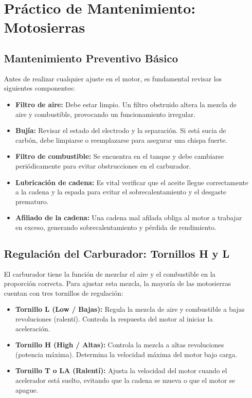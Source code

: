 \documentclass[../main]{subfiles}
\begin{document}
\section{Práctico de Mantenimiento: Motosierras}


\subsection{Mantenimiento Preventivo Básico}

Antes de realizar cualquier ajuste en el motor, es fundamental revisar los siguientes componentes:

\begin{itemize}
    \item \textbf{Filtro de aire:} Debe estar limpio. Un filtro obstruido altera la mezcla de aire y combustible, provocando un funcionamiento irregular.
    \item \textbf{Bujía:} Revisar el estado del electrodo y la separación. Si está sucia de carbón, debe limpiarse o reemplazarse para asegurar una chispa fuerte.
    \item \textbf{Filtro de combustible:} Se encuentra en el tanque y debe cambiarse periódicamente para evitar obstrucciones en el carburador.
    \item \textbf{Lubricación de cadena:} Es vital verificar que el aceite llegue correctamente a la cadena y la espada para evitar el sobrecalentamiento y el desgaste prematuro.
    \item \textbf{Afiliado de la cadena:} Una cadena mal afilada obliga al motor a trabajar en exceso, generando sobrecalentamiento y pérdida de rendimiento.
\end{itemize}

\subsection{Regulación del Carburador: Tornillos H y L}

El carburador tiene la función de mezclar el aire y el combustible en la proporción correcta. Para ajustar esta mezcla, la mayoría de las motosierras cuentan con tres tornillos de regulación:

\begin{itemize}
    \item \textbf{Tornillo L (Low / Bajas):} Regula la mezcla de aire y combustible a bajas revoluciones (ralentí). Controla la respuesta del motor al iniciar la aceleración.
    \item \textbf{Tornillo H (High / Altas):} Controla la mezcla a altas revoluciones (potencia máxima). Determina la velocidad máxima del motor bajo carga.
    \item \textbf{Tornillo T o LA (Ralentí):} Ajusta la velocidad del motor cuando el acelerador está suelto, evitando que la cadena se mueva o que el motor se apague.
\end{itemize}
\end{document}
